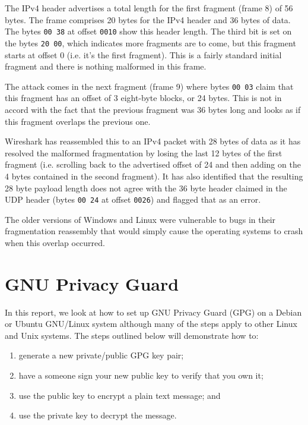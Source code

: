 \documentclass{report}
\begin{document}
The IPv4 header advertises a total length for the first fragment (frame 8)
of 56 bytes. The frame comprises 20 bytes for the IPv4 header and 36 bytes of
data. The bytes \texttt{00 38} at offset \texttt{0010} show this header length.
The third bit is set on the bytes \texttt{20 00}, which indicates more
fragments are to come, but this fragment starts at offset 0 (i.e. it's the first
fragment). This is a fairly standard initial fragment and there is nothing
malformed in this frame.

The attack comes in the next fragment (frame 9) where bytes \texttt{00 03}
claim that this fragment has an offset of 3 eight-byte blocks, or 24 bytes.
This is not in accord with the fact that the previous fragment was 36 bytes
long and looks as if this fragment overlaps the previous one.

Wireshark
has reassembled this to an IPv4 packet with 28 bytes of data as it has
resolved the malformed fragmentation by losing the last 12 bytes of the
first fragment (i.e. scrolling back to the advertised offset of 24 and
then adding on the 4 bytes contained in the second fragment). It has
also identified that the resulting 28 byte payload length does not
agree with the 36 byte header claimed in the UDP header (bytes \texttt{00 24}
at offset \texttt{0026}) and flagged that as an error.

The older versions of Windows and Linux were vulnerable to bugs in
their fragmentation reassembly that would simply cause the operating
systems to crash when this overlap occurred.

\chapter{GNU Privacy Guard}

In this report, we look at how to set up GNU Privacy Guard (GPG)
on a Debian or Ubuntu GNU/Linux
system although many of the steps apply to other Linux and Unix systems.
The steps outlined below will demonstrate how to:

\begin{enumerate}
\item generate a new private/public GPG key pair;
\item have a someone sign your new public key to verify that you own it;
\item use the public key to encrypt a plain text message; and
\item use the private key to decrypt the message.
\end{enumerate}
\end{document}
